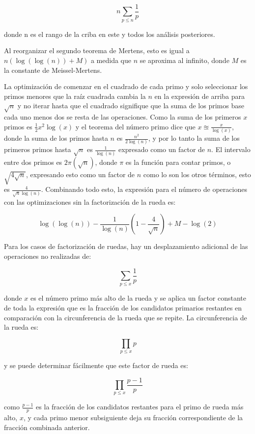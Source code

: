 \documentclass[12pt]{article}
\newcommand{\nl}{\vspace{0.3cm}}
\begin{document}
$$n \sum_{p \leqslant n}\frac{1}{p}$$

donde n es el rango de la criba en este y todos los análisis posteriores.

\nl

Al reorganizar el segundo teorema de Mertens, esto es igual a $n (\log(\log(n)) + M)$ a medida que $n$ se aproxima al infinito, donde $M$ es la constante de Meissel-Mertens.

\nl

La optimización de comenzar en el cuadrado de cada primo y solo seleccionar los primos menores que la raíz cuadrada cambia la $n$ en la expresión de arriba para $\sqrt{n}$ y no iterar hasta que el cuadrado signifique que la suma de los primos base cada uno menos dos se resta de las operaciones. Como la suma de los primeros $x$ primos es $\frac{1}{2}x^2\log(x)$\cite{ant} y el teorema del número primo dice que $x \approxeq \frac{x}{\log(x)}$, donde la suma de los primos hasta $n$ es $\frac{n^2}{2 \log(n)}$, y por lo tanto la suma de los primeros primos hasta $\sqrt{n}$ es $\frac{1}{\log(n)}$ expresado como un factor de $n$. El intervalo entre dos primos es $2\pi(\sqrt{n})$, donde $\pi$ es la función para contar primos, o $\sqrt{4\sqrt{n}}$, expresando esto como un factor de $n$ como lo son los otros términos, esto es $\frac{4}{\sqrt{n}\log(n)}$. Combinando todo esto, la expresión para el número de operaciones con las optimizaciones sin la factorización de la rueda es:

$$\log(\log(n)) - \frac{1}{\log(n)} \left(1  -\frac{4}{\sqrt{n}}\right) + M - \log(2)$$

Para los casos de factorización de ruedas, hay un desplazamiento adicional de las operaciones no realizadas de:

$$ \sum_{p \leqslant x}\frac{1}{p} $$

donde $x$ es el número primo más alto de la rueda y se aplica un factor constante de toda la expresión que es la fracción de los candidatos primarios restantes en comparación con la circunferencia de la rueda que se repite. La circunferencia de la rueda es:

$$ \prod_{p \leqslant x}p $$

y se puede determinar fácilmente que este factor de rueda es:

$$ \prod_{p \leqslant x}\frac{p - 1}{p} $$

como $\frac{p - 1}{p}$ es la fracción de los candidatos restantes para el primo de rueda más alto, $x$, y cada primo menor subsiguiente deja su fracción correspondiente de la fracción combinada anterior.
\end{document}
